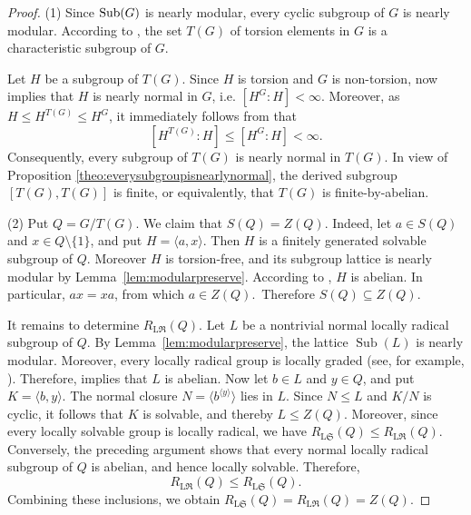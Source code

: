 \documentclass[11pt, reqno]{amsart}
\numberwithin{equation}{section}
\theoremstyle{definition}
\numberwithin{equation}{section}
\begin{document}
\begin{proof} (1)
Since $\textup{Sub}(G)$ is nearly modular, every cyclic subgroup of $G$ is nearly modular. According to \cite[Proposition~1]{Giovanni}, the set $T(G)$ of torsion elements in $G$ is a characteristic subgroup of $G$. 

Let $H$ be a subgroup of $T(G)$. Since $H$ is torsion and $G$ is non-torsion, \cite[Corollary~9]{Giovanni} now implies that $H$ is nearly normal in $ G $, i.e.
$[H^G : H] < \infty.$ Moreover, as $ H \leq H^{T(G)} \leq H^G $, it immediately follows from \cite[1.7.11]{Scott2010} that $$[H^{T(G)} : H] \leq [H^G : H] < \infty.$$  Consequently, every subgroup of $ T(G) $ is nearly normal in $ T(G) $. In view of Proposition \ref{theo:everysubgroupisnearlynormal}, the derived subgroup $ [T(G),T(G)] $ is finite, or equivalently, that $ T(G) $ is finite-by-abelian. 

\medskip
(2) Put $Q = G/T(G)$. We claim that $S(Q)=Z(Q)$. Indeed, let $a\in S(Q)$ and $x\in Q \setminus \{1\}$, and put $H=\langle a,x\rangle$. Then $H$ is a finitely generated solvable subgroup of $Q$. Moreover $H$ is torsion-free, and its subgroup lattice is nearly modular by Lemma~\ref{lem:modularpreserve}. According to \cite[Theorem~10]{Giovanni}, $H$ is abelian. In particular, $ax=xa$, from which $a\in Z(Q)$.~Therefore $S(Q)\subseteq Z(Q)$.

It remains to determine $R_{\mathrm{L}\mathfrak R}(Q)$. Let $L$ be a
nontrivial normal locally radical subgroup of $Q$. By Lemma~\ref{lem:modularpreserve}, the lattice $\operatorname{Sub}(L)$ is nearly modular. Moreover, every locally radical group is locally graded (see, for example, \cite[comments preceding Corollary~4.3.9]{Dixon17}).
Therefore, \cite[Theorem~10]{Giovanni} implies that $L$ is abelian.
Now let $b \in L$ and $y \in Q$, and put $K = \langle b, y \rangle$. The normal closure $N = \langle b^{\langle y \rangle} \rangle$ lies in $L$. Since $N \le L$ and $K/N$ is cyclic, it follows that $K$ is solvable, and thereby $L \le Z(Q)$. Moreover, since every locally solvable group is locally radical, we have
$R_{\mathrm{L}\mathfrak S}(Q)
\leq
R_{\mathrm{L}\mathfrak R}(Q).$
Conversely, the preceding argument shows that every normal locally radical
subgroup of $Q$ is abelian, and hence locally solvable. Therefore,
$$R_{\mathrm{L}\mathfrak R}(Q) \leq R_{\mathrm{L}\mathfrak S}(Q).$$
Combining these inclusions, we obtain
$R_{\mathrm{L}\mathfrak S}(Q) =R_{\mathrm{L}\mathfrak R}(Q) = Z(Q).$
\end{proof}
\end{document}
